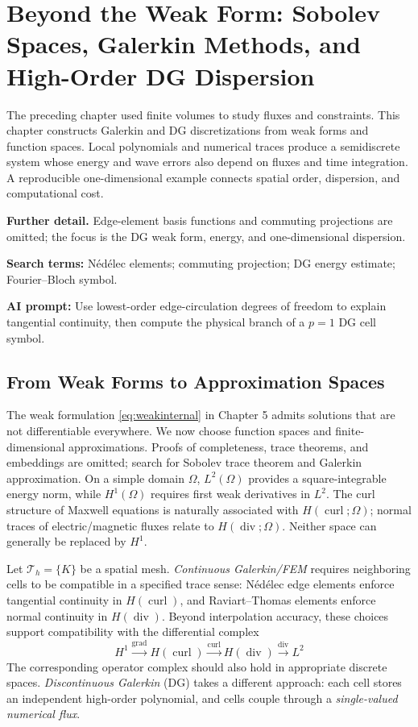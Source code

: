 \documentclass[11pt,openany]{book}
\numberwithin{equation}{chapter}
\theoremstyle{definition}
\theoremstyle{remark}
\newcommand{\grad}{\operatorname{grad}}
\newcommand{\Div}{\operatorname{div}}
\newcommand{\curl}{\operatorname{curl}}
\newcommand{\studyroute}[3]{%
  \par\smallskip\noindent\textbf{Further detail.} #1\par
  \begingroup\raggedright\noindent\textbf{Search terms:} #2.\par\endgroup
  \noindent\textbf{AI prompt:} #3\par
}
\begin{document}
\chapter[Weak Forms, Galerkin Methods, and DG Dispersion]{Beyond the Weak Form: Sobolev Spaces, Galerkin Methods, and High-Order DG Dispersion}\label{ch:dg}
\begin{chaptersummary}
The preceding chapter used finite volumes to study fluxes and constraints.
This chapter constructs Galerkin and DG discretizations from weak forms and function spaces.
Local polynomials and numerical traces produce a semidiscrete system whose energy and wave errors also depend on fluxes and time integration.
A reproducible one-dimensional example connects spatial order, dispersion, and computational cost.
\end{chaptersummary}
\studyroute{Edge-element basis functions and commuting projections are omitted; the focus is the DG weak form, energy, and one-dimensional dispersion.}{N\'ed\'elec elements; commuting projection; DG energy estimate; Fourier--Bloch symbol}{Use lowest-order edge-circulation degrees of freedom to explain tangential continuity, then compute the physical branch of a $p=1$ DG cell symbol.}
\section{From Weak Forms to Approximation Spaces}
The weak formulation \eqref{eq:weakinternal} in Chapter 5 admits solutions that are not differentiable everywhere.
We now choose function spaces and finite-dimensional approximations.
Proofs of completeness, trace theorems, and embeddings are omitted; search for Sobolev trace theorem and Galerkin approximation.
On a simple domain $\Omega$, $L^2(\Omega)$ provides a square-integrable energy norm,
while $H^1(\Omega)$ requires first weak derivatives in $L^2$.
The curl structure of Maxwell equations is naturally associated with $H(\curl;\Omega)$;
normal traces of electric/magnetic fluxes relate to $H(\Div;\Omega)$.
Neither space can generally be replaced by $H^1$.

Let $\mathcal T_h=\{K\}$ be a spatial mesh.
\emph{Continuous Galerkin/FEM} requires neighboring cells to be compatible in a specified trace sense:
N\'ed\'elec edge elements enforce tangential continuity in $H(\curl)$, and Raviart--Thomas elements enforce normal continuity in $H(\Div)$.
Beyond interpolation accuracy, these choices support compatibility with the differential complex
\begin{equation}\label{eq:derhamfem}
H^1\xrightarrow{\grad}H(\curl)
\xrightarrow{\curl}H(\Div)\xrightarrow{\Div}L^2
\end{equation}
The corresponding operator complex should also hold in appropriate discrete spaces.
\emph{Discontinuous Galerkin} (DG) takes a different approach:
each cell stores an independent high-order polynomial, and cells couple through a \emph{single-valued numerical flux}.
\end{document}
